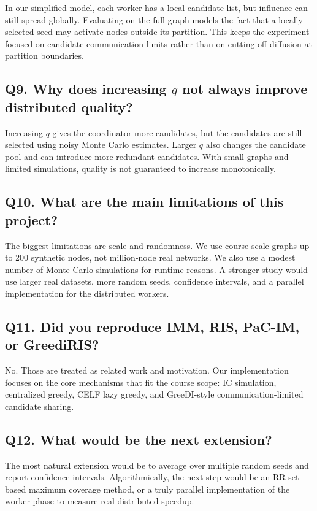 \documentclass[10pt]{article}
\begin{document}
In our simplified model, each worker has a local candidate list, but influence
can still spread globally. Evaluating on the full graph models the fact that a
locally selected seed may activate nodes outside its partition. This keeps the
experiment focused on candidate communication limits rather than on cutting
off diffusion at partition boundaries.

\subsection*{Q9. Why does increasing \(q\) not always improve distributed
quality?}

Increasing \(q\) gives the coordinator more candidates, but the candidates are
still selected using noisy Monte Carlo estimates. Larger \(q\) also changes
the candidate pool and can introduce more redundant candidates. With small
graphs and limited simulations, quality is not guaranteed to increase
monotonically.

\subsection*{Q10. What are the main limitations of this project?}

The biggest limitations are scale and randomness. We use course-scale graphs
up to 200 synthetic nodes, not million-node real networks. We also use a
modest number of Monte Carlo simulations for runtime reasons. A stronger study
would use larger real datasets, more random seeds, confidence intervals, and a
parallel implementation for the distributed workers.

\subsection*{Q11. Did you reproduce IMM, RIS, PaC-IM, or GreediRIS?}

No. Those are treated as related work and motivation. Our implementation
focuses on the core mechanisms that fit the course scope: IC simulation,
centralized greedy, CELF lazy greedy, and GreeDI-style communication-limited
candidate sharing.

\subsection*{Q12. What would be the next extension?}

The most natural extension would be to average over multiple random seeds and
report confidence intervals. Algorithmically, the next step would be an
RR-set-based maximum coverage method, or a truly parallel implementation of
the worker phase to measure real distributed speedup.
\end{document}
